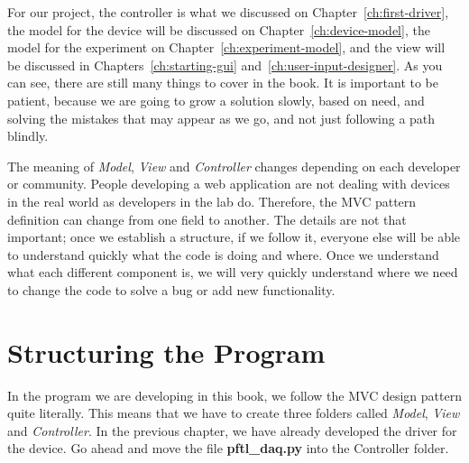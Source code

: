 For our project, the controller is what we discussed on Chapter~\ref{ch:first-driver}, the model for the device will be discussed on Chapter~\ref{ch:device-model}, the model for the experiment on Chapter~\ref{ch:experiment-model}, and the view will be discussed in Chapters~\ref{ch:starting-gui} and~\ref{ch:user-input-designer}. As you can see, there are still many things to cover in the book. It is important to be patient, because we are going to grow a solution slowly, based on need, and solving the mistakes that may appear as we go, and not just following a path blindly.


The meaning of \emph{Model}, \emph{View} and \emph{Controller} changes depending on each developer or community. People developing a web application are not dealing with devices in the real world as developers in the lab do. Therefore, the {MVC} pattern definition can change from one field to another. The details are not that important; once we establish a structure, if we follow it, everyone else will be able to understand quickly what the code is doing and where. Once we understand what each different component is, we will very quickly understand where we need to change the code to solve a bug or add new functionality.

\section{Structuring the Program}\label{sec:structure-of-theprogram}
In the program we are developing in this book, we follow the MVC design pattern quite literally. This means that we have to create three folders called \emph{Model}, \emph{View} and \emph{Controller}. In the previous chapter, we have already developed the driver for the device. Go ahead and move the file \textbf{pftl\_daq.py} into the Controller folder.


